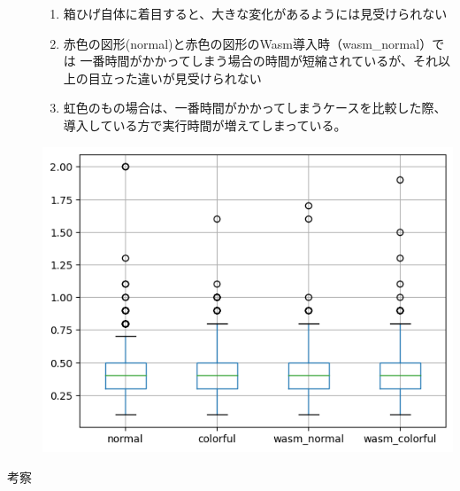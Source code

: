 \begin{description}
\begin{minipage}[t]{0.4\textwidth}
		\begin{enumerate}[parsep=-0.5\zh]
			\item 箱ひげ自体に着目すると、大きな変化があるようには見受けられない
			\item 赤色の図形(normal)と赤色の図形のWasm導入時（wasm_normal）では
			一番時間がかかってしまう場合の時間が短縮されているが、それ以上の目立った違いが見受けられない
			\item 虹色のもの場合は、一番時間がかかってしまうケースを比較した際、導入している方で実行時間が増えてしまっている。
		\end{enumerate}
	\end{minipage}
	\begin{minipage}[t]{0.6\textwidth}\vspace{0pt}
		\begin{center}
			\includegraphics[keepaspectratio, width=.9\linewidth,trim={0mm 0mm 0mm 0mm},clip]{box_chart.png}
		\end{center}
	\end{minipage}
	\newpage
	\item[考察]~\\
	\begin{description}

\end{description}
\end{description}
